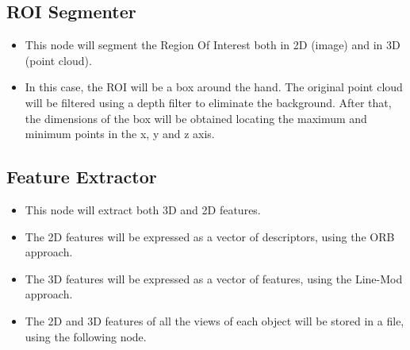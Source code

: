 \documentclass{article}
\begin{document}
\subsection{ROI Segmenter}
\begin{itemize}
	\item This node will segment the Region Of Interest both in 2D (image) and in 3D (point cloud). 
	\item In this case, the ROI will be a box around the hand. The original point cloud will be filtered using a depth filter to eliminate the background. After that, the dimensions of the box will be obtained locating the maximum and minimum points in the x, y and z axis. 
\end{itemize}


\subsection{Feature Extractor}
\begin{itemize}
\item This node will extract both 3D and 2D features. 
\item The 2D features will be expressed as a vector of descriptors, using the ORB approach. 
\item The 3D features will be expressed as a vector of features, using the Line-Mod approach.

\item The 2D and 3D features of all the views of each object will be stored in a file, using the following node.  
\end{itemize}
\end{document}
